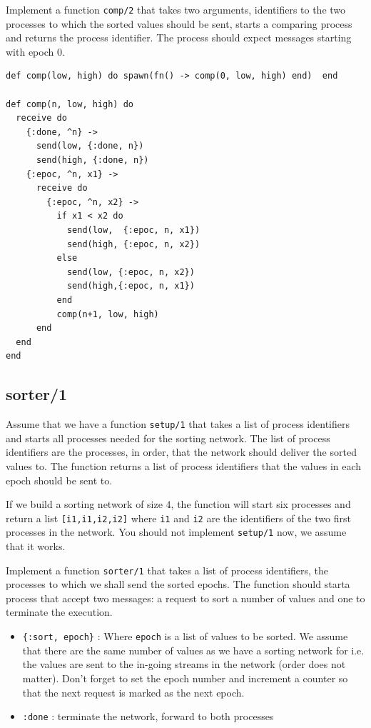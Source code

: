 \documentclass[a4paper,11pt]{article}
\begin{document}
Implement a function {\tt comp/2} that takes two arguments,
  identifiers to the two processes to which the sorted values should be
  sent, starts a comparing process and returns the process
  identifier. The process should expect messages starting with epoch $0$.



\begin{verbatim}
def comp(low, high) do spawn(fn() -> comp(0, low, high) end)  end
  
def comp(n, low, high) do
  receive do
    {:done, ^n} ->
      send(low, {:done, n})   
      send(high, {:done, n})
    {:epoc, ^n, x1} ->
      receive do
        {:epoc, ^n, x2} ->
          if x1 < x2 do
            send(low,  {:epoc, n, x1})
            send(high, {:epoc, n, x2})
          else
            send(low, {:epoc, n, x2})
            send(high,{:epoc, n, x1})
          end
          comp(n+1, low, high)
      end
  end
end
\end{verbatim}


\subsection{sorter/1}


Assume that we have a function {\tt setup/1} that takes a list of
  process identifiers and starts all processes needed for the sorting
  network. The list of process identifiers are the processes, in
  order, that the network should deliver the sorted values to. The
  function returns a list of process identifiers that the values in
  each epoch should be sent to.

If we build a sorting network of size $4$, the function will start
  six processes and return a list {\tt [i1,i1,i2,i2]} where {\tt i1}
  and {\tt i2} are the identifiers of the two first processes in the
  network. You should not implement {\tt setup/1} now, we assume that
  it works.


Implement a function {\tt sorter/1} that takes a list of process
identifiers, the processes to which we shall send the sorted
epochs. The function should starta process that accept two messages: a
request to sort a number of values and one to terminate the execution.

  
\begin{itemize}
\item {\tt \{:sort, epoch\}} : Where {\tt epoch} is a list of values to be sorted. We assume that
    there are the same number of values as we have a sorting network
    for i.e. the values are sent to the in-going streams in the network
    (order does not matter).  Don't forget to set the epoch number and
    increment a counter so that the next request is marked as the next epoch.


  \item {\tt :done} : terminate the network, forward to both processes
\end{itemize}
\end{document}
